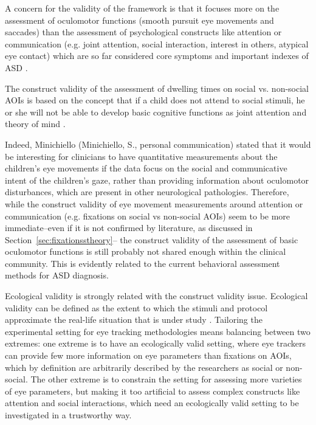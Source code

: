 A concern for the validity of the framework is that it focuses more on the assessment of oculomotor functions (smooth pursuit eye movements and saccades) than the assessment of psychological constructs like attention or communication (e.g. joint attention, social interaction, interest in others, atypical eye contact) which are so far considered core symptoms and important indexes of ASD \citep{maganto2017screening}.

The construct validity of the assessment of dwelling times on social vs. non-social AOIs is based on the concept that if a child does not attend to social stimuli, he or she will not be able to develop basic cognitive functions as joint attention and theory of mind \citep{vonhofsten2009lookingevents}.

Indeed, Minichiello (Minichiello, S., personal communication) stated that it would be interesting for clinicians to have quantitative measurements about the children’s eye movements if the data focus on the social and communicative intent of the children’s gaze, rather than providing information about oculomotor disturbances, which are present in other neurological pathologies. Therefore, while the construct validity of eye movement measurements around attention or communication (e.g. fixations on social vs non-social AOIs) seem to be more immediate–even if it is not confirmed by literature, as discussed in Section~\ref{sec:fixationsstheory}– the construct validity of the assessment of basic oculomotor functions is still probably not shared enough within the clinical community. This is evidently related to the current behavioral assessment methods for ASD diagnosis.

Ecological validity is strongly related with the construct validity issue. Ecological validity can be defined as the extent to which the stimuli and protocol approximate the real-life situation that is under study \citep{boraston2007eyetrackingASD}. Tailoring the experimental setting for eye tracking methodologies means balancing between two extremes: one extreme is to have an ecologically valid setting, where eye trackers can provide few more information on eye parameters than fixations on AOIs, which by definition are arbitrarily described by the researchers as social or non-social. The other extreme is to constrain the setting for assessing more varieties of eye parameters, but making it too artificial to assess complex constructs like attention and social interactions, which need an ecologically valid setting to be investigated in a trustworthy way.

